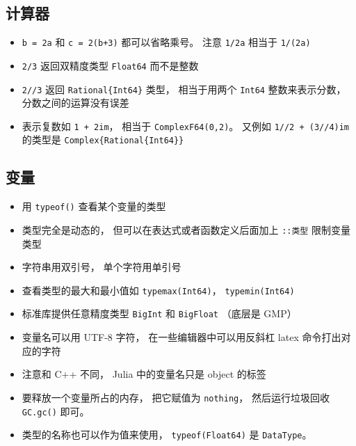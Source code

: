 \subsection{计算器}
\begin{itemize}
\item \verb|b = 2a| 和 \verb|c = 2(b+3)| 都可以省略乘号。 注意 \verb|1/2a| 相当于 \verb|1/(2a)|
\item \verb|2/3| 返回双精度类型 \verb|Float64| 而不是整数
\item \verb|2//3| 返回 \verb|Rational{Int64}| 类型， 相当于用两个 \verb|Int64| 整数来表示分数， 分数之间的运算没有误差
\item 表示复数如 \verb|1 + 2im|， 相当于 \verb|ComplexF64(0,2)|。 又例如 \verb|1//2 + (3//4)im| 的类型是 \verb|Complex{Rational{Int64}}|
\end{itemize}

\subsection{变量}
\begin{itemize}
\item 用 \verb|typeof()| 查看某个变量的类型
\item 类型完全是动态的， 但可以在表达式或者函数定义后面加上 \verb|::类型| 限制变量类型
\item 字符串用双引号， 单个字符用单引号
\item 查看类型的最大和最小值如 \verb|typemax(Int64)|， \verb|typemin(Int64)|
\item 标准库提供任意精度类型 \verb|BigInt| 和 \verb|BigFloat| （底层是 GMP）
\item 变量名可以用 UTF-8 字符， 在一些编辑器中可以用反斜杠 latex 命令打出对应的字符
\item 注意和 C++ 不同， Julia 中的变量名只是 object 的标签
\item 要释放一个变量所占的内存， 把它赋值为 \verb|nothing|， 然后运行垃圾回收 \verb|GC.gc()| 即可。
\item 类型的名称也可以作为值来使用， \verb|typeof(Float64)| 是 \verb|DataType|。
\end{itemize}

